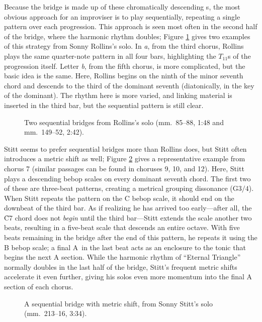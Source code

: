Because the bridge is made up of these chromatically descending \tf{}s, the most
obvious approach for an improviser is to play sequentially, repeating a single
pattern over each \tf progression. This approach is seen most often in the
second half of the bridge, where the harmonic rhythm doubles; Figure
\ref{et:sr-seq-bridge} gives two examples of this strategy from Sonny Rollins's
solo. In \emph{a}, from the third chorus, Rollins plays the same
quarter-note pattern in all four bars, highlighting the $T_{11}$s of the
progression itself. Letter \emph{b}, from the fifth chorus, is
more complicated, but the basic idea is the same. Here, Rollins begins on the
ninth of the minor seventh chord and descends to the third of the dominant
seventh (diatonically, in the key of the dominant). The rhythm here is more
varied, and linking material is inserted in the third bar, but the sequential
pattern is still clear.

\begin{figure}[tbp]
  \caption[Two sequential bridges from Rollins's solo.]{%
    Two sequential bridges from Rollins's solo (mm.~85--88, 1:48 and
    mm.~149--52, 2:42).}
  \label{et:sr-seq-bridge}
\end{figure}

Stitt seems to prefer sequential bridges more than Rollins does, but Stitt
often introduces a metric shift as well; Figure \ref{et:ss-bridge-shift} gives
a representative example from chorus 7 (similar passages can be found in
choruses 9, 10, and 12). Here, Stitt plays a descending bebop scales on every
dominant seventh chord. The first two of these are three-beat patterns,
creating a metrical grouping dissonance (G$3/4$). When Stitt repeats
the pattern on the C bebop scale, it should end on the downbeat of the third
bar. As if realizing he has arrived too early---after all, the \h{C7} chord
does not \emph{begin} until the third bar---Stitt extends the scale another
two beats, resulting in a five-beat scale that descends an entire octave. With
five beats remaining in the bridge after the end of this pattern, he repeats
it using the B bebop scale; a final A\nat\ in the last beat acts as an
enclosure to the tonic \Bflat that begins the next A section. While the
harmonic rhythm of ``Eternal Triangle'' normally doubles in the last half of
the bridge, Stitt's frequent metric shifts accelerate it even further, giving
his solos even more momentum into the final A section of each chorus.

\begin{figure}[tbp]
  \caption[A sequential bridge with metric shift from Sonny Stitt's solo.]{%
    A sequential bridge with metric shift, from Sonny Stitt's solo
    (mm.~213--16, 3:34).}
  \label{et:ss-bridge-shift}
\end{figure}

